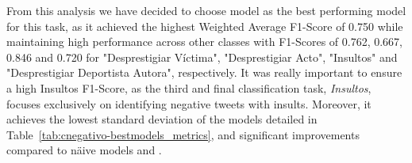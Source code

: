 \begin{table}[H]
    \centering
    \begingroup
    \small %
    \endgroup
\end{table}


From this analysis we have decided to choose model \textbf{\cneglrted}  as the best performing model for this task, as it achieved the highest Weighted Average F1-Score of 0.750 while maintaining high performance across other classes with F1-Scores of 0.762, 0.667, 0.846 and 0.720 for "Desprestigiar Víctima", "Desprestigiar Acto", "Insultos" and "Desprestigiar Deportista Autora", respectively. It was really important to ensure a high Insultos F1-Score, as the third and final classification task, \textit{Insultos}, focuses exclusively on identifying negative tweets with insults. Moreover, it achieves the lowest standard deviation of the models detailed in Table~\ref{tab:cnegativo-bestmodels_metrics}, and significant improvements compared to näive models {\cnegmajor} and {\cnegrandom}.

